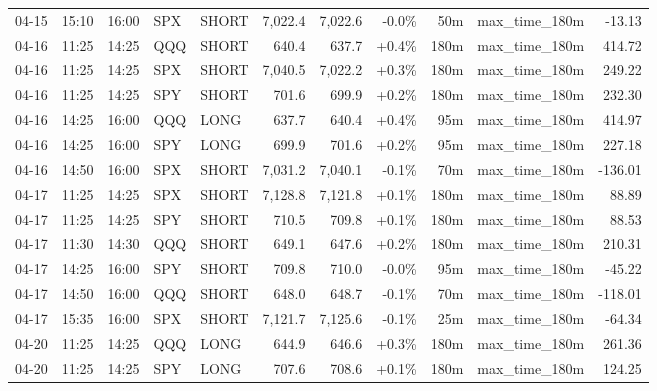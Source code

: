\documentclass[11pt,a4paper,twoside]{article}
\begin{document}
\begin{center}
\begin{longtable}{>{\color{txtmain}}l l l l l r r r r >{\color{txtmain}}l r}
04-15 & 15:10 & 16:00 & SPX & SHORT & 7,022.4 & 7,022.6 & \textcolor{lossred}{-0.0\%} & 50m & max\_time\_180m & \textcolor{lossred}{-13.13} \\
04-16 & 11:25 & 14:25 & QQQ & SHORT & 640.4 & 637.7 & \textcolor{wingreen}{+0.4\%} & 180m & max\_time\_180m & \textcolor{wingreen}{414.72} \\
04-16 & 11:25 & 14:25 & SPX & SHORT & 7,040.5 & 7,022.2 & \textcolor{wingreen}{+0.3\%} & 180m & max\_time\_180m & \textcolor{wingreen}{249.22} \\
04-16 & 11:25 & 14:25 & SPY & SHORT & 701.6 & 699.9 & \textcolor{wingreen}{+0.2\%} & 180m & max\_time\_180m & \textcolor{wingreen}{232.30} \\
04-16 & 14:25 & 16:00 & QQQ & LONG & 637.7 & 640.4 & \textcolor{wingreen}{+0.4\%} & 95m & max\_time\_180m & \textcolor{wingreen}{414.97} \\
04-16 & 14:25 & 16:00 & SPY & LONG & 699.9 & 701.6 & \textcolor{wingreen}{+0.2\%} & 95m & max\_time\_180m & \textcolor{wingreen}{227.18} \\
04-16 & 14:50 & 16:00 & SPX & SHORT & 7,031.2 & 7,040.1 & \textcolor{lossred}{-0.1\%} & 70m & max\_time\_180m & \textcolor{lossred}{-136.01} \\
04-17 & 11:25 & 14:25 & SPX & SHORT & 7,128.8 & 7,121.8 & \textcolor{wingreen}{+0.1\%} & 180m & max\_time\_180m & \textcolor{wingreen}{88.89} \\
04-17 & 11:25 & 14:25 & SPY & SHORT & 710.5 & 709.8 & \textcolor{wingreen}{+0.1\%} & 180m & max\_time\_180m & \textcolor{wingreen}{88.53} \\
04-17 & 11:30 & 14:30 & QQQ & SHORT & 649.1 & 647.6 & \textcolor{wingreen}{+0.2\%} & 180m & max\_time\_180m & \textcolor{wingreen}{210.31} \\
04-17 & 14:25 & 16:00 & SPY & SHORT & 709.8 & 710.0 & \textcolor{lossred}{-0.0\%} & 95m & max\_time\_180m & \textcolor{lossred}{-45.22} \\
04-17 & 14:50 & 16:00 & QQQ & SHORT & 648.0 & 648.7 & \textcolor{lossred}{-0.1\%} & 70m & max\_time\_180m & \textcolor{lossred}{-118.01} \\
04-17 & 15:35 & 16:00 & SPX & SHORT & 7,121.7 & 7,125.6 & \textcolor{lossred}{-0.1\%} & 25m & max\_time\_180m & \textcolor{lossred}{-64.34} \\
04-20 & 11:25 & 14:25 & QQQ & LONG & 644.9 & 646.6 & \textcolor{wingreen}{+0.3\%} & 180m & max\_time\_180m & \textcolor{wingreen}{261.36} \\
04-20 & 11:25 & 14:25 & SPY & LONG & 707.6 & 708.6 & \textcolor{wingreen}{+0.1\%} & 180m & max\_time\_180m & \textcolor{wingreen}{124.25} \\

\end{longtable}
\end{center}
\end{document}
